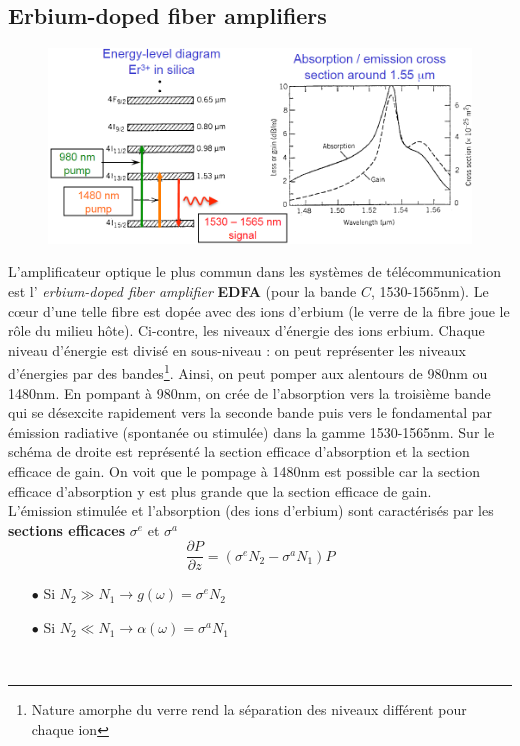 \subsection{Erbium-doped fiber amplifiers}
	\begin{figure}
	\includegraphics[scale=0.4]{ch6/image4}
	\label{fig:Er}
	\end{figure}
L'amplificateur optique le plus commun dans les systèmes de télécommunication est l'\textit{
erbium-doped fiber amplifier} \textbf{EDFA} (pour la bande $C$, 1530-1565nm). Le cœur d'une telle 
fibre est dopée avec des ions d'erbium (le verre de la fibre joue le rôle du milieu hôte). Ci-contre,
les niveaux d'énergie des ions erbium. Chaque niveau d'énergie est divisé en sous-niveau : on peut
représenter les niveaux d'énergies par des bandes\footnote{Nature amorphe du verre rend la séparation
des niveaux différent pour chaque ion}. Ainsi, on peut pomper aux alentours de 980nm ou 1480nm. En 
pompant à 980nm, on crée de l'absorption vers la troisième bande qui se désexcite rapidement vers
la seconde bande puis vers le fondamental par émission radiative (spontanée ou stimulée) dans la gamme
1530-1565nm. Sur le schéma de droite est représenté la section efficace d'absorption et la section
efficace de gain. On voit que le pompage à 1480nm est possible car la section efficace d'absorption y
est plus grande que la section efficace de gain.\\

L'émission stimulée et l'absorption (des ions d'erbium) sont caractérisés par les \textbf{sections
efficaces} $\sigma^e$ et $\sigma^a$
\begin{equation}
\frac{{\partial P}}{{\partial z}} = (\sigma _{}^e{N_2} - \sigma _{}^a{N_1})P
\end{equation}
\begin{itemize}
\item[$\bullet$] Si $N_2\gg N_1\to g(\omega) = \sigma^eN_2$
\item[$\bullet$] Si $N_2\ll N_1\to \alpha(\omega) = \sigma^aN_1$
\end{itemize}\ 


